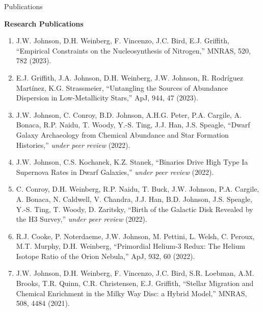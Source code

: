 \documentclass[main.tex]{subfiles}
\begin{document}
\begin{singlespace}

\begin{center}
{\large Publications}
\end{center}

\begin{flushleft}
\textbf{Research Publications}
\end{flushleft}

\begin{enumerate}

	\item J.W. Johnson, D.H. Weinberg, F. Vincenzo, J.C. Bird, E.J. Griffith,
	``Empirical Constraints on the Nucleosynthesis of Nitrogen,'' MNRAS, 520,
	782 (2023).

	\item E.J. Griffith, J.A. Johnson, D.H. Weinberg, J.W. Johnson,
	R. Rodr\'iguez Mart\'inez, K.G. Strassmeier, ``Untangling the Sources of
	Abundance Dispersion in Low-Metallicity Stars,'' ApJ, 944, 47 (2023).

	\item J.W. Johnson, C. Conroy, B.D. Johnson, A.H.G. Peter, P.A. Cargile,
	A. Bonaca, R.P. Naidu, T. Woody, Y.-S. Ting, J.J. Han, J.S. Speagle,
	``Dwarf Galaxy Archaeology from Chemical Abundance and Star Formation
	Histories,'' \textit{under peer review} (2022).

	\item J.W. Johnson, C.S. Kochanek, K.Z. Stanek, ``Binaries Drive High Type
	Ia Supernova Rates in Dwarf Galaxies,'' \textit{under peer review} (2022).

	\item C. Conroy, D.H. Weinberg, R.P. Naidu, T. Buck, J.W. Johnson,
	P.A. Cargile, A. Bonaca, N. Caldwell, V. Chandra, J.J. Han, B.D. Johnson,
	J.S. Speagle, Y.-S. Ting, T. Woody, D. Zaritsky, ``Birth of the Galactic
	Disk Revealed by the H3 Survey,'' \textit{under peer review} (2022).

	\item R.J. Cooke, P. Noterdaeme, J.W. Johnson, M. Pettini, L. Welsh,
	C. Peroux, M.T. Murphy, D.H. Weinberg, ``Primordial Helium-3 Redux: The
	Helium Isotope Ratio of the Orion Nebula,'' ApJ, 932, 60 (2022).

	\item J.W. Johnson, D.H. Weinberg, F. Vincenzo, J.C. Bird, S.R. Loebman,
	A.M. Brooks, T.R. Quinn, C.R. Christensen, E.J. Griffith, ``Stellar
	Migration and Chemical Enrichment in the Milky Way Disc: a Hybrid Model,''
	MNRAS, 508, 4484 (2021).


\end{enumerate}
\end{singlespace}
\end{document}

